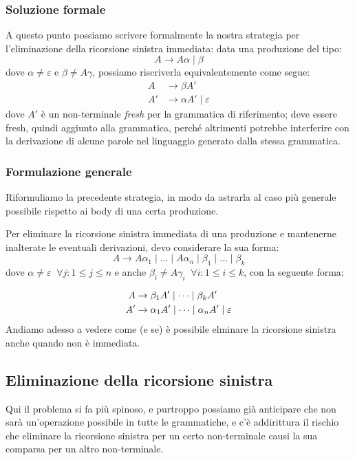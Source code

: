 \documentclass[class=book, crop=false, oneside, 12pt]{standalone}
\begin{document}
\subsubsection{Soluzione formale}
A questo punto possiamo scrivere formalmente la nostra strategia per l'eliminazione della ricorsione sinistra immediata: data una produzione del tipo:
\begin{equation*}
    A \to A \alpha \mid \beta
\end{equation*}
dove \(\alpha \ne \varepsilon\) e \(\beta \ne A \gamma\), possiamo riscriverla equivalentemente come segue:
\begin{align*}
    A &\to \beta A' \\
    A' &\to \alpha A' \mid \varepsilon
\end{align*}
dove \(A'\) è un non-terminale \emph{fresh} per la grammatica di riferimento; deve essere fresh, quindi aggiunto alla grammatica, perché altrimenti potrebbe interferire con la derivazione di alcune parole nel linguaggio generato dalla stessa grammatica.

\subsubsection{Formulazione generale}
Riformuliamo la precedente strategia, in modo da astrarla al caso più generale possibile rispetto ai body di una certa produzione.

Per eliminare la ricorsione sinistra immediata di una produzione e mantenerne inalterate le eventuali derivazioni, devo considerare la sua forma:
\begin{equation}
    A \to A \alpha_1 \mid \dots \mid A \alpha_n \mid \beta_1 \mid \dots \mid \beta_k
\end{equation} 
dove \(\alpha \ne \varepsilon \;\; \forall j: 1 \le j \le n\) e anche \(\beta_i \ne A \gamma_i \;\; \forall i: 1 \le i \le k\), con la seguente forma:

\begin{align}
    A &\to \beta_1 A' \mid \dots \mid \beta_k A' \\
    A' &\to \alpha_1 A' \mid \dots \mid \alpha_n A' \mid \varepsilon \notag
\end{align}
Andiamo adesso a vedere come (e se) è possibile elminare la ricorsione sinistra anche quando non è immediata.

\subsection{Eliminazione della ricorsione sinistra}
Qui il problema si fa più spinoso, e purtroppo possiamo già anticipare che non sarà un'operazione possibile in tutte le grammatiche, e c'è addirittura il rischio che eliminare la ricorsione sinistra per un certo non-terminale causi la sua comparsa per un altro non-terminale.
\end{document}
